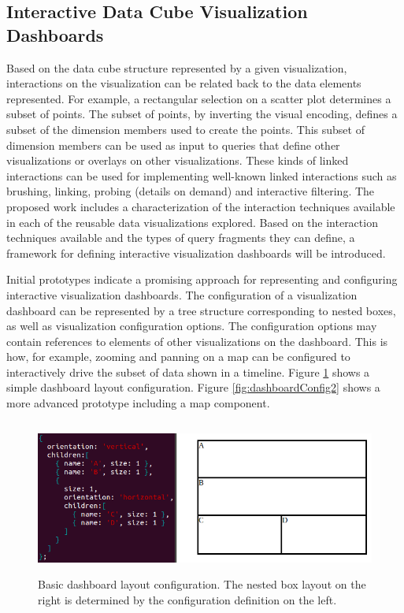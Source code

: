 \documentclass[12pt]{article}
\begin{document}
\begin{doublespace}
\subsection{Interactive Data Cube Visualization Dashboards}
Based on the data cube structure represented by a given visualization, interactions on the visualization can be related back to the data elements represented. For example, a rectangular selection on a scatter plot determines a subset of points. The subset of points, by inverting the visual encoding, defines a subset of the dimension members used to create the points. This subset of dimension members can be used as input to queries that define other visualizations or overlays on other visualizations. These kinds of linked interactions can be used for implementing well-known linked interactions such as brushing, linking, probing (details on demand) and interactive filtering. The proposed work includes a characterization of the interaction techniques available in each of the reusable data visualizations explored. Based on the interaction techniques available and the types of query fragments they can define, a framework for defining interactive visualization dashboards will be introduced.

Initial prototypes indicate a promising approach for representing and configuring interactive visualization dashboards. The configuration of a visualization dashboard can be represented by a tree structure corresponding to nested boxes, as well as visualization configuration options. The configuration options may contain references to elements of other visualizations on the dashboard. This is how, for example, zooming and panning on a map can be configured to interactively drive the subset of data shown in a timeline. Figure \ref{fig:dashboardConfig1} shows a simple dashboard layout configuration. Figure \ref{fig:dashboardConfig2} shows a more advanced prototype including a map component.

\begin{figure}[h!]
  \centering
  \includegraphics[height=2in]{figures/dashboardLayout.png}
  \caption[Basic dashboard layout configuration.]
   {Basic dashboard layout configuration. The nested box layout on the right is determined by the configuration definition on the left.}
  \label{fig:dashboardConfig1}
\end{figure}


\end{doublespace}
\end{document}
